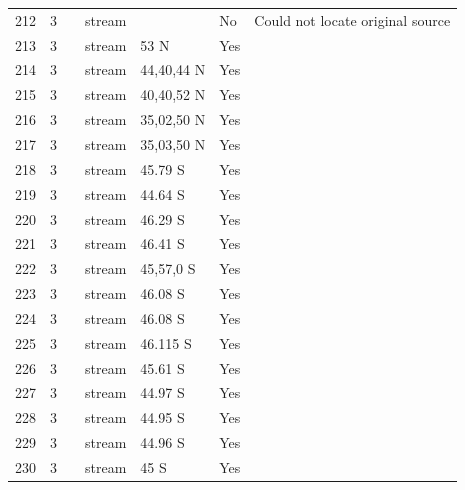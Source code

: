 \documentclass[12pt]{article}
\begin{document}
\begin{landscape}
\begin{table}[h!]
{\begin{tabular}{p{2.8cm}p{1.3cm}p{3cm}p{2.2cm}p{2.5cm}lp{8.2cm}}
        212   & 3 & \cite{Ricker1935}  & stream &       & No    & Could not locate original source \\
        213   & 3 & \cite{Badcock1949}     & stream & 53 N  & Yes   &       \\
        214   & 3 & \cite{Thompson2003}    & stream & 44,40,44 N & Yes   &       \\
        215   & 3 & \cite{Thompson2003}    & stream & 40,40,52 N & Yes   &       \\
        216   & 3 & \cite{Thompson2003}    & stream & 35,02,50 N & Yes   &       \\
        217   & 3 & \cite{Thompson2003}    & stream & 35,03,50 N & Yes   &       \\
        218   & 3 & \cite{Thompson2004c}  & stream & 45.79 S & Yes   &       \\
        219   & 3 & \cite{Thompson2004c}  & stream & 44.64 S & Yes   &       \\
        220   & 3 & \cite{Thompson2004c}  & stream & 46.29 S & Yes   &       \\
        221   & 3 & \cite{Thompson2004c}  & stream & 46.41 S & Yes   &       \\
        222   & 3 & \cite{Thompson2004c}  & stream & 45,57,0 S & Yes   &       \\
        223   & 3 & \cite{Thompson2004c}  & stream & 46.08 S & Yes   &       \\
        224   & 3 & \cite{Thompson2004c}  & stream & 46.08 S & Yes   &       \\
        225   & 3 & \cite{Thompson2004c}  & stream & 46.115 S & Yes   &       \\
        226   & 3 & \cite{Thompson2004c}  & stream & 45.61 S & Yes   &       \\
        227   & 3 & \cite{Thompson2004c}  & stream & 44.97 S & Yes   &       \\
        228   & 3 & \cite{Thompson2004c}  & stream & 44.95 S & Yes   &       \\
        229   & 3 & \cite{Thompson2004c}  & stream & 44.96 S & Yes   &       \\
        230   & 3 & \cite{Thompson2004c}  & stream & 45 S  & Yes   &       \\
        \hline
      \end{tabular}}%
      \end{table}

        \newpage


\end{landscape}
\end{document}

